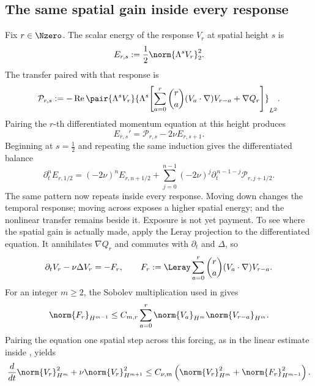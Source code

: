 \subsection{The same spatial gain inside every response}\label{sub:SobolevRegularityInsideEveryCompletedRow}

Fix \(r\in\Nzero\).  The scalar energy of the response \(V_r\) at spatial
height \(s\) is
\[
  E_{r,s}:=\frac12\norm{\Lambda^sV_r}_2^2.
\]
The transfer paired with that response is
\[
  \mathcal P_{r,s}
  :=-
  \operatorname{Re}
  \pair{\Lambda^sV_r}
  {\Lambda^s\!\left[
    \sum_{a=0}^{r}\binom{r}{a}(V_a\cdot\nabla)V_{r-a}
    +\nabla Q_r
  \right]}_{L^2}.
\]
Pairing the \(r\)-th differentiated momentum equation at this height produces
\begin{equation}\label{eq:BodyEveryTemporalRowSpatialEnergy}
  E_{r,s}'=\mathcal P_{r,s}-2\nu E_{r,s+1}.
\end{equation}
Beginning at \(s=\tfrac12\) and repeating the same induction gives the
differentiated balance
\begin{equation}\label{eq:BodyEveryTemporalRowCompletedHeight}
  \partial_t^nE_{r,1/2}
  =(-2\nu)^nE_{r,n+1/2}
  +\sum_{j=0}^{n-1}
  (-2\nu)^j
  \partial_t^{\,n-1-j}\mathcal P_{r,j+1/2}.
\end{equation}
The same pattern now repeats inside every response.  Moving down changes the
temporal response; moving across exposes a higher spatial energy; and the
nonlinear transfer remains beside it.  Exposure is not yet payment.  To see
where the spatial gain is actually made, apply the Leray projection to the
differentiated equation.  It annihilates \(\nabla Q_r\) and commutes with
\(\partial_t\) and \(\Delta\), so
\[
  \partial_tV_r-\nu\Delta V_r=-F_r,
  \qquad
  F_r:=\Leray\sum_{a=0}^{r}\binom{r}{a}(V_a\cdot\nabla)V_{r-a}.
\]
For an integer \(m\geq2\), the Sobolev multiplication used in
 gives
\begin{equation}\label{eq:BodyTemporalResponseForcingEstimate}
  \norm{F_r}_{H^{m-1}}
  \leq
  C_{m,r}\sum_{a=0}^{r}
  \norm{V_a}_{H^m}\norm{V_{r-a}}_{H^m}.
\end{equation}
Pairing the equation one spatial step across this forcing, as in the linear
estimate inside , yields
\begin{equation}\label{eq:BodyTemporalResponseParabolicGain}
  \frac d{dt}\norm{V_r}_{H^m}^2
  +\nu\norm{V_r}_{H^{m+1}}^2
  \leq
  C_{\nu,m}\left(
    \norm{V_r}_{H^m}^2+\norm{F_r}_{H^{m-1}}^2
  \right).
\end{equation}
